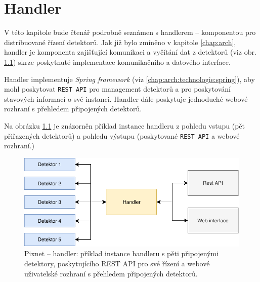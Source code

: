 

\chapter{Handler}\label{chap:handler}

V této kapitole bude čtenář podrobně seznámen s handlerem -- komponentou pro distribuované řízení detektorů. Jak již bylo zmíněno v kapitole \ref{chap:arch}, handler je komponenta zajišťující komunikaci a vyčítání dat z detektorů (viz obr. \ref{fig:handler:overview}) skrze poskytnuté implementace komunikačního a datového interface.
  
Handler implementuje \textit{Spring framework} (viz \ref{chap:arch:technologie:spring}), aby mohl poskytovat \texttt{REST API} pro management detektorů a pro poskytování stavových informací o své instanci. Handler dále poskytuje jednoduché webové rozhraní s přehledem připojených detektorů.

Na obrázku \ref{fig:handler:overview} je znázorněn příklad instance handleru z pohledu vstupu (pět přiřazených detektorů) a pohledu výstupu (poskytované \texttt{REST API} a webové rozhraní.)

\begin{figure}[bh]
	\begin{center}
		\vspace*{1cm}
		\includegraphics[width=14cm]{figures/handler_overview.pdf}
		\caption{Pixnet -- handler: příklad instance handleru s pěti připojenými detektory, poskytujícího REST API pro své řízení a webové uživatelské rozhraní s přehledem připojených detektorů.}
		\label{fig:handler:overview}
	\end{center}
\end{figure}

\newpage

